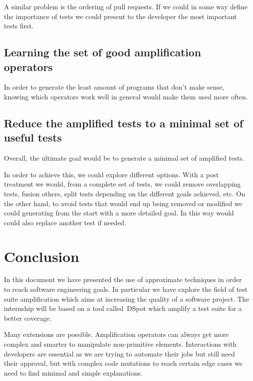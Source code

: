 \documentclass[11pt]{sdm}
\newcommand{\dspot}{DSpot\xspace}
\begin{document}
A similar problem is the ordering of pull requests.
If we could in some way define the importance of tests we could present to the developer the most important tests first.


\subsection{Learning the set of good amplification operators}
\label{learning}
In order to generate the least amount of programs that don't make sense, knowing which operators work well in general would make them used more often.

\subsection{Reduce the amplified tests to a minimal set of useful tests}
\label{minimal}
Overall, the ultimate goal would be to generate a minimal set of amplified tests.

In order to achieve this, we could explore different options.
With a post treatment we would, from a complete set of tests, we could remove overlapping tests, fusion others, split tests depending on the different goals achieved, etc.
On the other hand, to avoid tests that would end up being removed or modified we could generating from the start with a more detailed goal.
In this way would could also replace another test if needed.


\section*{Conclusion}
\label{conclu}
In this document we have presented the use of approximate techniques in order to reach software engineering goals.
In particular we have explore the field of test suite amplification which aims at increasing the quality of a software project.
The internship will be based on a tool called~\dspot{} which amplify a test suite for a better coverage.

Many extensions are possible.
Amplification operators can always get more complex and smarter to manipulate non-primitive elements.
Interactions with developers are essential as we are trying to automate their jobs but still need their approval, but with complex code mutations to reach certain edge cases we need to find minimal and simple explanations.




\end{document}
